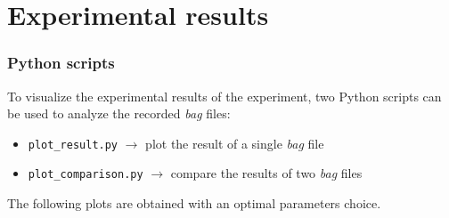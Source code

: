 \documentclass{beamer}
\begin{document}
\section{Experimental results}



\begin{frame}
\frametitle{Python scripts}

To visualize the experimental results of the experiment, two Python scripts can
be used to analyze the recorded \textit{bag} files:
\begin{itemize}
  \item \texttt{plot\_result.py} $\rightarrow$ plot the result of a single \textit{bag} file
  \item \texttt{plot\_comparison.py} $\rightarrow$ compare the results of two \textit{bag} files
\end{itemize}

\vspace{2em}

The following plots are obtained with an optimal parameters choice.

\end{frame}

\end{document}
